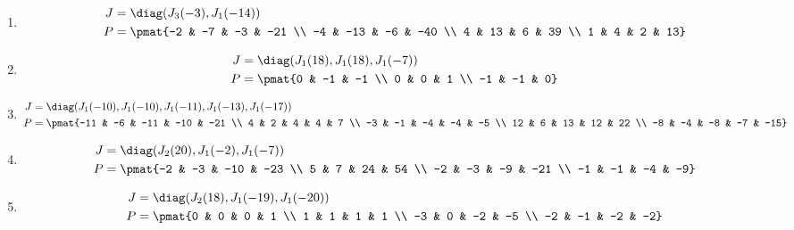 \begin{enumerate}
\item

\begin{align*}
J &= \diag(J_{3}(-3), J_{1}(-14))\\
P &= \pmat{-2 & -7 & -3 & -21 \\ -4 & -13 & -6 & -40 \\ 4 & 13 & 6 & 39 \\ 1 & 4 & 2 & 13}
\end{align*}

\item

\begin{align*}
J &= \diag(J_{1}(18), J_{1}(18), J_{1}(-7))\\
P &= \pmat{0 & -1 & -1 \\ 0 & 0 & 1 \\ -1 & -1 & 0}
\end{align*}

\item

\begin{align*}
J &= \diag(J_{1}(-10), J_{1}(-10), J_{1}(-11), J_{1}(-13), J_{1}(-17))\\
P &= \pmat{-11 & -6 & -11 & -10 & -21 \\ 4 & 2 & 4 & 4 & 7 \\ -3 & -1 & -4 & -4 & -5 \\ 12 & 6 & 13 & 12 & 22 \\ -8 & -4 & -8 & -7 & -15}
\end{align*}

\item

\begin{align*}
J &= \diag(J_{2}(20), J_{1}(-2), J_{1}(-7))\\
P &= \pmat{-2 & -3 & -10 & -23 \\ 5 & 7 & 24 & 54 \\ -2 & -3 & -9 & -21 \\ -1 & -1 & -4 & -9}
\end{align*}

\item

\begin{align*}
J &= \diag(J_{2}(18), J_{1}(-19), J_{1}(-20))\\
P &= \pmat{0 & 0 & 0 & 1 \\ 1 & 1 & 1 & 1 \\ -3 & 0 & -2 & -5 \\ -2 & -1 & -2 & -2}
\end{align*}


\end{enumerate}
